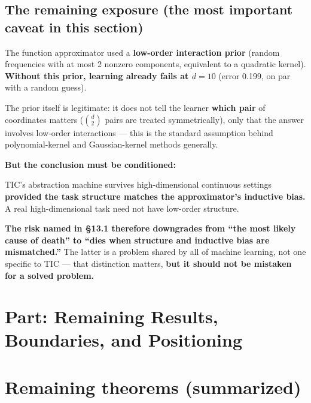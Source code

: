 \documentclass[11pt]{article}
\renewenvironment{quote}
  {\def\FrameCommand{{\color{gray!60}\vrule width 2pt}\hspace{8pt}}%
   \MakeFramed{\advance\hsize-\width \FrameRestore}\begin{itshape}}
  {\end{itshape}\endMakeFramed}
\begin{document}
\hypertarget{the-remaining-exposure-the-most-important-caveat-in-this-section}{%
\subsection{The remaining exposure (the most important caveat in this section)}\label{the-remaining-exposure-the-most-important-caveat-in-this-section}}

The function approximator used a \textbf{low-order interaction prior} (random frequencies with at most 2 nonzero components, equivalent to a quadratic kernel). \textbf{Without this prior, learning already fails at \(d=10\)} (error 0.199, on par with a random guess).

The prior itself is legitimate: it does not tell the learner \textbf{which pair} of coordinates matters (\(\binom d2\) pairs are treated symmetrically), only that the answer involves low-order interactions --- this is the standard assumption behind polynomial-kernel and Gaussian-kernel methods generally.

\textbf{But the conclusion must be conditioned:}

\begin{quote}
TIC's abstraction machine survives high-dimensional continuous settings \textbf{provided the task structure matches the approximator's inductive bias.} A real high-dimensional task need not have low-order structure.
\end{quote}

\textbf{The risk named in \S{}13.1 therefore downgrades from ``the most likely cause of death'' to ``dies when structure and inductive bias are mismatched.''} The latter is a problem shared by all of machine learning, not one specific to TIC --- that distinction matters, \textbf{but it should not be mistaken for a solved problem.}

\hypertarget{part-remaining-results-boundaries-and-positioning}{%
\section*{Part: Remaining Results, Boundaries, and Positioning}\label{part-remaining-results-boundaries-and-positioning}}

\hypertarget{remaining-theorems-summarized}{%
\section{Remaining theorems (summarized)}\label{remaining-theorems-summarized}}
\end{document}
